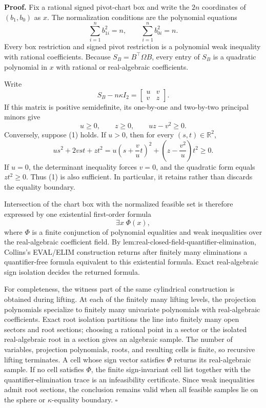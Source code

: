 \textbf{Proof.}
Fix a rational signed pivot-chart box and write the \(2n\) coordinates of \((b_1,b_0)\) as \(x\).  The normalization conditions are the polynomial equations
\[
\sum_{i=1}^n b_{1i}^2=n,
\qquad
\sum_{i=1}^n b_{0i}^2=n.
\]
Every box restriction and signed pivot restriction is a polynomial weak inequality with rational coefficients.  Because \(S_B=B^{\top}\Omega B\), every entry of \(S_B\) is a quadratic polynomial in \(x\) with rational or real-algebraic coefficients.

Write
\[
S_B-n\kappa I_2=
\begin{bmatrix}u&v\\v&z\end{bmatrix}.
\]
If this matrix is positive semidefinite, its one-by-one and two-by-two principal minors give
\[
u\ge0,\qquad z\ge0,\qquad uz-v^2\ge0. \tag{1}
\]
Conversely, suppose (1) holds.  If \(u>0\), then for every \((s,t)\in\mathbb R^2\),
\[
us^2+2vst+zt^2
=u\left(s+\frac vu t\right)^2
+\left(z-\frac{v^2}{u}\right)t^2\ge0.
\]
If \(u=0\), the determinant inequality forces \(v=0\), and the quadratic form equals \(zt^2\ge0\).  Thus (1) is also sufficient.  In particular, it retains rather than discards the equality boundary.

Intersection of the chart box with the normalized feasible set is therefore expressed by one existential first-order formula
\[
\exists x\;\Phi(x),
\]
where \(\Phi\) is a finite conjunction of polynomial equalities and weak inequalities over the real-algebraic coefficient field.  By lem:real-closed-field-quantifier-elimination, Collins's EVAL/ELIM construction returns after finitely many eliminations a quantifier-free formula equivalent to this existential formula.  Exact real-algebraic sign isolation decides the returned formula.

For completeness, the witness part of the same cylindrical construction is obtained during lifting.  At each of the finitely many lifting levels, the projection polynomials specialize to finitely many univariate polynomials with real-algebraic coefficients.  Exact root isolation partitions the line into finitely many open sectors and root sections; choosing a rational point in a sector or the isolated real-algebraic root in a section gives an algebraic sample.  The number of variables, projection polynomials, roots, and resulting cells is finite, so recursive lifting terminates.  A cell whose sign vector satisfies \(\Phi\) returns its real-algebraic sample.  If no cell satisfies \(\Phi\), the finite sign-invariant cell list together with the quantifier-elimination trace is an infeasibility certificate.  Since weak inequalities admit root sections, the conclusion remains valid when all feasible samples lie on the sphere or \(\kappa\)-equality boundary. \(\square\)